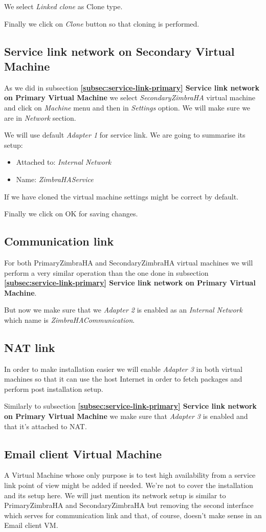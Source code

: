 We select \textit{Linked clone} as Clone type.

Finally we click on \textit{Clone} button so that cloning is performed.

\subsection {Service link network on Secondary Virtual Machine}
As we did in subsection \textbf{\ref{subsec:service-link-primary} Service link network on Primary Virtual Machine} we select \textit{SecondaryZimbraHA} virtual machine and click on \textit{Machine} menu and then in \textit{Settings} option. We will make sure we are in \textit{Network} section.

We will use default \textit{Adapter 1} for service link. We are going to summarise its setup:
\begin{itemize}
  \item Attached to: \textit{Internal Network}
  \item Name: \textit{ZimbraHAService}
\end{itemize}

If we have cloned the virtual machine settings might be correct by default.

Finally we click on OK for saving changes.

\subsection {Communication link}
For both PrimaryZimbraHA and SecondaryZimbraHA virtual machines we will perform a very similar operation than the one done in subsection \textbf{\ref{subsec:service-link-primary} Service link network on Primary Virtual Machine}.

But now we make sure that we \textit{Adapter 2} is enabled as an \textit{Internal Network} which name is \textit{ZimbraHACommunication}.

\subsection {NAT link}
In order to make installation easier we will enable \textit{Adapter 3} in both virtual machines so that it can use the host Internet in order to fetch packages and perform post installation setup.

Similarly to subsection \textbf{\ref{subsec:service-link-primary} Service link network on Primary Virtual Machine} we make sure that \textit{Adapter 3} is enabled and that it's attached to NAT.

\subsection {Email client Virtual Machine}
A Virtual Machine whose only purpose is to test high availability from a service link point of view might be added if needed. We're not to cover the installation and its setup here. We will just mention its network setup is similar to PrimaryZimbraHA and SecondaryZimbraHA but removing the second interface which serves for communication link and that, of course, doesn't make sense in an Email client VM.